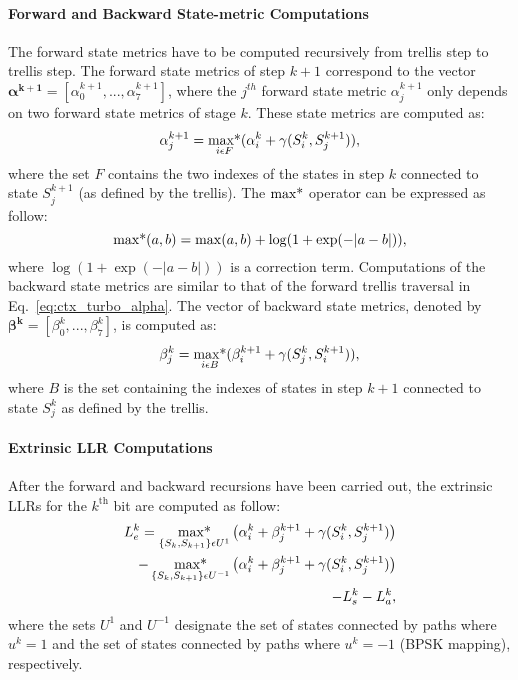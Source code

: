 \paragraph{Forward and Backward State-metric Computations}

The forward state metrics have to be computed recursively from trellis step to
trellis step. The forward state metrics of step $k+1$ correspond to the vector
$\bm{\alpha^{k+1}} = [\alpha_0^{k+1}, ... ,\alpha_7^{k+1}]$, where the
$j^{th}$ forward state metric $\alpha_j^{k+1}$ only depends on two forward
state metrics of stage $k$. These state metrics are computed as:
\begin{equation}
  \label{eq:ctx_turbo_alpha}
  \alpha_j^{k+1} =
  \operatorname*{max*}_{i \epsilon F} ( \alpha_i^k + \gamma(S_i^k, S_j^{k+1}) ),
\end{equation}
where the set $F$ contains the two indexes of the states in step $k$ connected
to state $S_j^{k+1}$ (as defined by the trellis). The $\operatorname*{max*}$ operator can be
expressed as follow:
\begin{equation}
   \operatorname*{max*}(a,b) = \max(a,b) + \log(1 + \exp(-|a-b|)),
\end{equation}
where $\log(1 + \exp(-|a-b|))$ is a correction term.
Computations of the backward state metrics are similar to that of the forward
trellis traversal in Eq.~\ref{eq:ctx_turbo_alpha}. The vector of backward state
metrics, denoted by $\bm{\beta^k} = [\beta_0^k, ..., \beta_7^k]$, is
computed as:
\begin{equation}
  \label{eq:ctx_turbo_beta}
  \beta_j^k =
  \operatorname*{max*}_{i \epsilon B} ( \beta_i^{k+1} + \gamma(S_j^k, S_i^{k+1}) ),
\end{equation}
where $B$ is the set containing the indexes of states in step $k+1$ connected to
state $S_j^k$ as defined by the trellis.

\paragraph{Extrinsic LLR Computations}

After the forward and backward recursions have been carried out, the extrinsic
LLRs for the $k^\text{th}$ bit are computed as follow:
\begin{equation}
  \label{eq:ctx_turbo_ext}
  \begin{aligned}
  L_e^k = \operatorname*{max*}_{\{S_k, S_{k+1}\}\epsilon U^1}\big( \alpha_i^k + \beta_j^{k+1} +
  \gamma(S_i^k, S_j^{k+1}) \big) \\
  - \operatorname*{max*}_{\{S_k, S_{k+1}\}\epsilon U^{-1}}\big( \alpha_i^k + \beta_j^{k+1} +
  \gamma(S_i^k, S_j^{k+1}) \big) \\
  - L_{s}^k - L_a^k,
  \end{aligned}
\end{equation}
where the sets $U^1$ and $U^{-1}$ designate the set of states connected by paths
where $u^k=1$ and the set of states connected by paths where $u^k=-1$ (BPSK
mapping), respectively.

